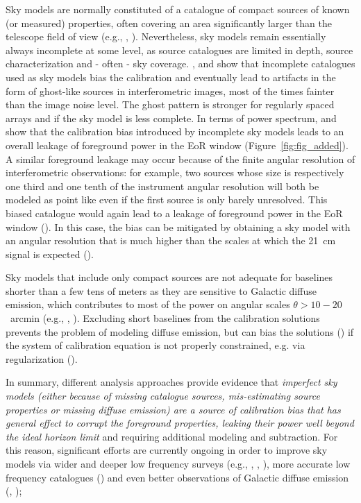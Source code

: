 \begin{itemize}
Sky models are normally constituted of a catalogue of compact sources of known (or measured) properties, often covering an area significantly larger than the telescope field of view (e.g., \cite{yatawatta13}, \cite{pober16}). Nevertheless, sky models remain essentially always incomplete at some level, as source catalogues are limited in depth, source characterization and - often - sky coverage. \cite{grobler14}, \cite{wijnholds16} and \cite{grobler16} show that incomplete catalogues used as sky models bias the calibration and eventually lead to artifacts in the form of ghost-like sources in interferometric images, most of the times fainter than the image noise level. The ghost pattern is stronger for regularly spaced arrays and if the sky model is less complete. In terms of power spectrum, \cite{ewall-wice17} and \cite{barry16} show that the calibration bias introduced by incomplete sky models leads to an overall leakage of foreground power in the EoR window (Figure~\ref{fig:fig_added}). A similar foreground leakage may occur because of the finite angular resolution of interferometric observations: for example, two sources whose size is respectively one third and one tenth of the instrument angular resolution will both be modeled as point like even if the first source is only barely unresolved. This biased catalogue would again lead to a leakage of foreground power in the EoR window (\cite{procopio17}). In this case, the bias can be mitigated by obtaining a sky model with an angular resolution that is much higher than the scales at which the 21~cm signal is expected (\cite{procopio17}).

Sky models that include only compact sources are not adequate for baselines shorter than a few tens of meters as they are sensitive to Galactic diffuse emission, which contributes to most of the power on angular scales $\theta > 10-20$~arcmin (e.g., \cite{bernardi09}, \cite{choudhuri17}). Excluding short baselines from the calibration solutions prevents the problem of modeling diffuse emission, but can bias the solutions (\cite{patil16}) if the system of calibration equation is not properly constrained, e.g. via regularization (\cite{sardabaradi19}).

In summary, different analysis approaches provide evidence that {\it imperfect sky models (either because of missing catalogue sources, mis-estimating source properties or missing diffuse emission) are a source of calibration bias that has general effect to corrupt the foreground properties, leaking their power well beyond the ideal horizon limit} and requiring additional modeling and subtraction. For this reason, significant efforts are currently ongoing in order to improve sky models via wider and deeper low frequency surveys (e.g., \cite{hurley-walker17}, \cite{intema17}, \cite{shimwell19}), more accurate low frequency catalogues (\cite{carroll16}) and even better observations of Galactic diffuse emission (\cite{zheng17}, \cite{dowell17}); 


\end{itemize}
